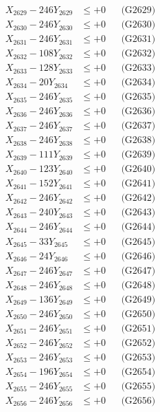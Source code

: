 \documentclass[a4paper,10pt]{article}
\begin{document}
{\begin{align}
X_{2629} - 246Y_{2629} &\leq +0 && \text{(G2629)} \\
X_{2630} - 246Y_{2630} &\leq +0 && \text{(G2630)} \\
\allowbreak
X_{2631} - 246Y_{2631} &\leq +0 && \text{(G2631)} \\
X_{2632} - 108Y_{2632} &\leq +0 && \text{(G2632)} \\
X_{2633} - 128Y_{2633} &\leq +0 && \text{(G2633)} \\
X_{2634} - 20Y_{2634} &\leq +0 && \text{(G2634)} \\
X_{2635} - 246Y_{2635} &\leq +0 && \text{(G2635)} \\
X_{2636} - 246Y_{2636} &\leq +0 && \text{(G2636)} \\
X_{2637} - 246Y_{2637} &\leq +0 && \text{(G2637)} \\
X_{2638} - 246Y_{2638} &\leq +0 && \text{(G2638)} \\
X_{2639} - 111Y_{2639} &\leq +0 && \text{(G2639)} \\
X_{2640} - 123Y_{2640} &\leq +0 && \text{(G2640)} \\
\allowbreak
X_{2641} - 152Y_{2641} &\leq +0 && \text{(G2641)} \\
X_{2642} - 246Y_{2642} &\leq +0 && \text{(G2642)} \\
X_{2643} - 240Y_{2643} &\leq +0 && \text{(G2643)} \\
X_{2644} - 246Y_{2644} &\leq +0 && \text{(G2644)} \\
X_{2645} - 33Y_{2645} &\leq +0 && \text{(G2645)} \\
X_{2646} - 24Y_{2646} &\leq +0 && \text{(G2646)} \\
X_{2647} - 246Y_{2647} &\leq +0 && \text{(G2647)} \\
X_{2648} - 246Y_{2648} &\leq +0 && \text{(G2648)} \\
X_{2649} - 136Y_{2649} &\leq +0 && \text{(G2649)} \\
X_{2650} - 246Y_{2650} &\leq +0 && \text{(G2650)} \\
\allowbreak
X_{2651} - 246Y_{2651} &\leq +0 && \text{(G2651)} \\
X_{2652} - 246Y_{2652} &\leq +0 && \text{(G2652)} \\
X_{2653} - 246Y_{2653} &\leq +0 && \text{(G2653)} \\
X_{2654} - 196Y_{2654} &\leq +0 && \text{(G2654)} \\
X_{2655} - 246Y_{2655} &\leq +0 && \text{(G2655)} \\
X_{2656} - 246Y_{2656} &\leq +0 && \text{(G2656)} \\

\end{align}}
\end{document}
